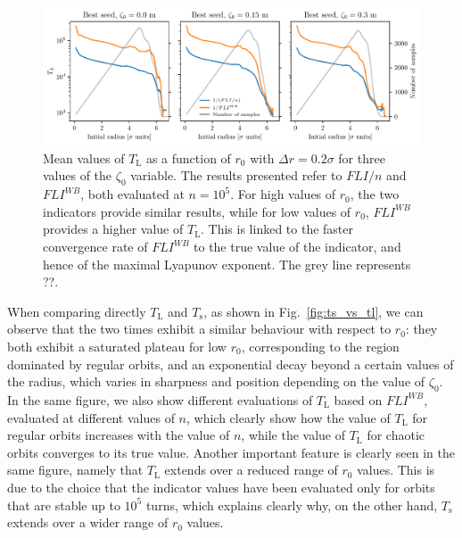 \begin{figure}
    \centering
    \includegraphics[width=1\textwidth]{6_lhc_dynamic_indicators/figs/lyapunov_time_vs_lyapunov_wb_time.pdf}
    \caption{Mean values of $T_\mathrm{L}$ as a function of $r_0$ with $\Delta r = 0.2\sigma$ for three values of the $\zeta_0$ variable. The results presented refer to $FLI/n$ and $FLI^{{WB}}$, both evaluated at $n=10^5$. For high values of $r_0$, the two indicators provide similar results, while for low values of $r_0$, $FLI^{{WB}}$ provides a higher value of $T_\mathrm{L}$. This is linked to the faster convergence rate of $FLI^{{WB}}$ to the true value of the indicator, and hence of the maximal Lyapunov exponent. The grey line represents ??.}
    \label{fig:lyapunov_time_fli_vs_wb}
\end{figure}

When comparing directly $T_\mathrm{L}$ and $T_\mathrm{s}$, as shown in Fig.~\ref{fig:ts_vs_tl}, we can observe that the two times exhibit a similar behaviour with respect to $r_0$: they both exhibit a saturated plateau for low $r_0$, corresponding to the region dominated by regular orbits, and an exponential decay beyond a certain values of the radius, which varies in sharpness and position depending on the value of $\zeta_0$. In the same figure, we also show different evaluations of $T_\mathrm{L}$ based on $FLI^{WB}$, evaluated at different values of $n$, which clearly show how the value of $T_\mathrm{L}$ for regular orbits increases with the value of $n$, while the value of $T_\mathrm{L}$ for chaotic orbits converges to its true value. Another important feature is clearly seen in the same figure, namely that $T_\mathrm{L}$ extends over a reduced range of $r_0$ values. This is due to the choice that the indicator values have been evaluated only for orbits that are stable up to $10^5$ turns, which explains clearly why, on the other hand, $T_\mathrm{s}$ extends over a wider range of $r_0$ values. 

